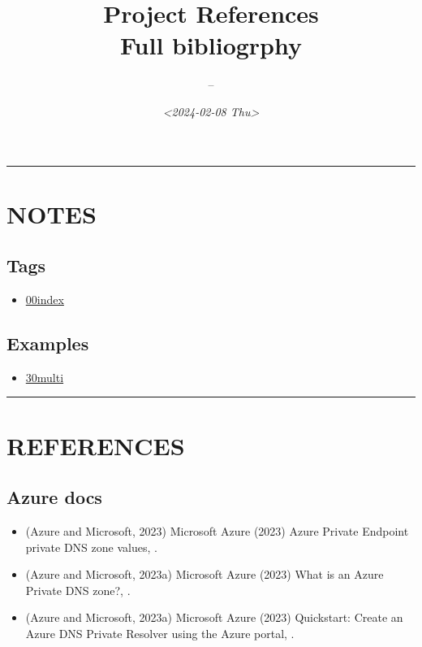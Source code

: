 \documentclass[10pt,a4paper]{article}
\author{--}
\date{\textit{<2024-02-08 Thu>}}
\title{Project References\\\medskip
\large Full bibliogrphy}
\begin{document}
\maketitle
\tableofcontents

\newpage

\noindent\rule{\textwidth}{0.5pt}
\section{NOTES}
\label{sec:orgac40879}
\subsection{Tags}
\label{sec:org28971fe}
\begin{itemize}
\item \href{../nat/20240122T161259--00index\_\_<meta>.org}{00index}
\end{itemize}
\subsection{Examples}
\label{sec:org8e9c6b5}
\begin{itemize}
\item \href{../nat/20241009T171120--30multi\_\_<meta>.org}{30multi}
\end{itemize}

\noindent\rule{.6\textwidth}{0.8pt}

\newpage

\section{REFERENCES}
\label{sec:org692e74c}
\subsection{Azure docs}
\label{sec:org5a99e4b}
\begin{itemize}
\item (Azure and Microsoft, 2023) Microsoft Azure (2023) Azure Private Endpoint private DNS zone values, .
\item (Azure and Microsoft, 2023a) Microsoft Azure (2023) What is an Azure Private DNS zone?, .
\item (Azure and Microsoft, 2023a) Microsoft Azure (2023) Quickstart: Create an Azure DNS Private Resolver using the Azure portal, .
\end{itemize}
\end{document}
